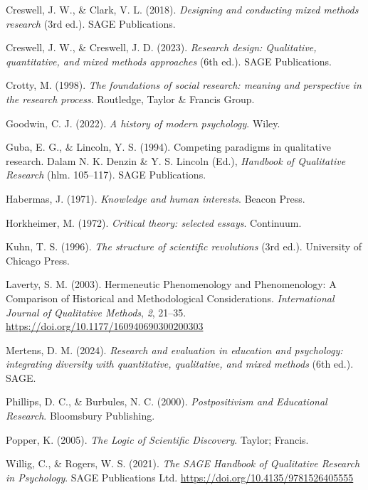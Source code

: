 \documentclass[
  indonesian,
  letterpaper,
  DIV=11,
  numbers=noendperiod]{scrreprt}
\newlength{\cslhangindent}
\newenvironment{CSLReferences}[2] %
 {\begin{list}{}{%
  \setlength{\itemindent}{0pt}
  \setlength{\leftmargin}{0pt}
  \setlength{\parsep}{0pt}
  \ifodd #1
   \setlength{\leftmargin}{\cslhangindent}
   \setlength{\itemindent}{-1\cslhangindent}
  \fi
  \setlength{\itemsep}{#2\baselineskip}}}
 {\end{list}}
\begin{document}
\label{refs--7}
\begin{CSLReferences}{1}{0}
Creswell, J. W., \& Clark, V. L. (2018). \emph{Designing and conducting
mixed methods research} (3rd ed.). SAGE Publications.

Creswell, J. W., \& Creswell, J. D. (2023). \emph{Research design:
Qualitative, quantitative, and mixed methods approaches} (6th ed.). SAGE
Publications.

Crotty, M. (1998). \emph{The foundations of social research: meaning and
perspective in the research process}. Routledge, Taylor \& Francis
Group.

Goodwin, C. J. (2022). \emph{A history of modern psychology}. Wiley.

Guba, E. G., \& Lincoln, Y. S. (1994). Competing paradigms in
qualitative research. Dalam N. K. Denzin \& Y. S. Lincoln (Ed.),
\emph{Handbook of Qualitative Research} (hlm. 105--117). SAGE
Publications.

Habermas, J. (1971). \emph{Knowledge and human interests}. Beacon Press.

Horkheimer, M. (1972). \emph{Critical theory: selected essays}.
Continuum.

Kuhn, T. S. (1996). \emph{The structure of scientific revolutions} (3rd
ed.). University of Chicago Press.

Laverty, S. M. (2003). Hermeneutic Phenomenology and Phenomenology: A
Comparison of Historical and Methodological Considerations.
\emph{International Journal of Qualitative Methods}, \emph{2}, 21--35.
\url{https://doi.org/10.1177/160940690300200303}

Mertens, D. M. (2024). \emph{Research and evaluation in education and
psychology: integrating diversity with quantitative, qualitative, and
mixed methods} (6th ed.). SAGE.

Phillips, D. C., \& Burbules, N. C. (2000). \emph{Postpositivism and
Educational Research}. Bloomsbury Publishing.

Popper, K. (2005). \emph{The Logic of Scientific Discovery}. Taylor;
Francis.

Willig, C., \& Rogers, W. S. (2021). \emph{The SAGE Handbook of
Qualitative Research in Psychology}. SAGE Publications Ltd.
\url{https://doi.org/10.4135/9781526405555}

\end{CSLReferences}
\end{document}
